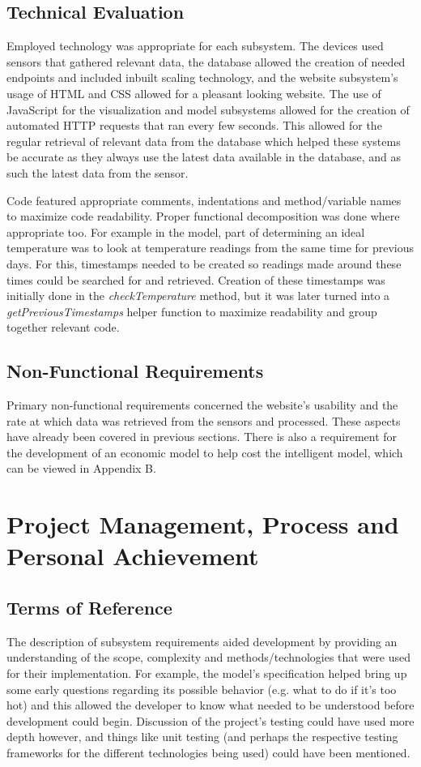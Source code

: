 \documentclass[]{report}
\begin{document}
	\subsection{Technical Evaluation}
	Employed technology was appropriate for each subsystem. The devices used sensors that gathered relevant data, the database allowed the creation of needed endpoints and included inbuilt scaling technology, and the website subsystem's usage of HTML and CSS allowed for a pleasant looking website. The use of JavaScript for the visualization and model subsystems allowed for the creation of automated HTTP requests that ran every few seconds. This allowed for the regular retrieval of relevant data from the database which helped these systems be accurate as they always use the latest data available in the database, and as such the latest data from the sensor.
	\medskip
	
	Code featured appropriate comments, indentations and method/variable names to maximize code readability. Proper functional decomposition was done where appropriate too. For example in the model, part of determining an ideal temperature was to look at temperature readings from the same time for previous days. For this, timestamps needed to be created so readings made around these times could be searched for and retrieved. Creation of these timestamps was initially done in the \textit{checkTemperature} method, but it was later turned into a \textit{getPreviousTimestamps} helper function to maximize readability and group together relevant code.
	
	\subsection{Non-Functional Requirements}
	Primary non-functional requirements concerned the website's usability and the rate at which data was retrieved from the sensors and processed. These aspects have already been covered in previous sections. There is also a requirement for the development of an economic model to help cost the intelligent model, which can be viewed in Appendix B.

\section{Project Management, Process and Personal Achievement}
	\subsection{Terms of Reference}
	The description of subsystem requirements aided development by providing an understanding of the scope, complexity and methods/technologies that were used for their implementation. For example, the model's specification helped bring up some early questions regarding its possible behavior (e.g. what to do if it's too hot) and this allowed the developer to know what needed to be understood before development could begin. Discussion of the project's testing could have used more depth however, and things like unit testing (and perhaps the respective testing frameworks for the different technologies being used) could have been mentioned.
	
\end{document}
